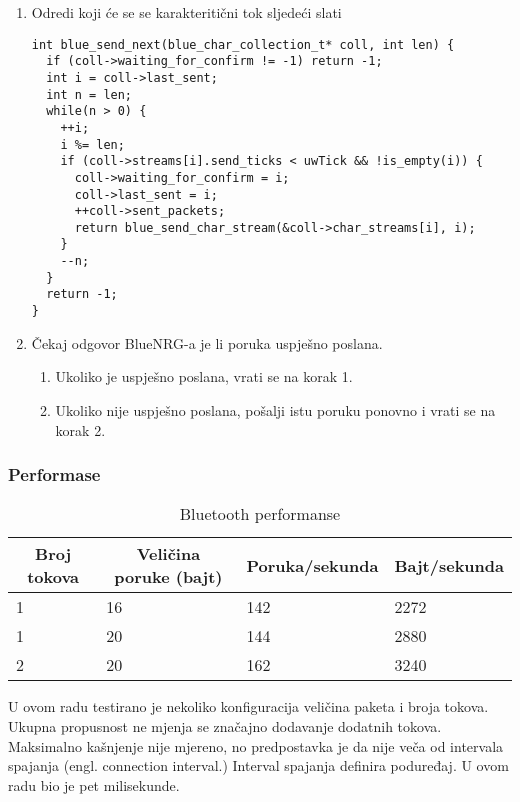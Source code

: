 \documentclass[times, utf8, diplomski]{diplomski}
\begin{document}
\begin{enumerate}
  \item Odredi koji će se se karakteritični tok sljedeći slati
\begin{lstlisting}[caption = {Procedura za odabir karakterističnog toka koji će sljedeći biti poslan}]
int blue_send_next(blue_char_collection_t* coll, int len) {
  if (coll->waiting_for_confirm != -1) return -1;
  int i = coll->last_sent;
  int n = len;
  while(n > 0) {
    ++i;
    i %= len;
    if (coll->streams[i].send_ticks < uwTick && !is_empty(i)) {
      coll->waiting_for_confirm = i;
      coll->last_sent = i;
      ++coll->sent_packets;
      return blue_send_char_stream(&coll->char_streams[i], i);
    }
    --n;
  }
  return -1;
}
\end{lstlisting}
  \item Čekaj odgovor BlueNRG-a je li poruka uspješno poslana.
    \begin{enumerate}
      \item Ukoliko je uspješno poslana, vrati se na korak 1.
      \item Ukoliko nije uspješno poslana, pošalji istu poruku ponovno i vrati se na korak 2.
    \end{enumerate}
\end{enumerate}


\subsubsection{Performase}

\begin{table}[h]
  \begin{center}
    \begin{tabular}[c]{l|l|l|l}
      \hline
      \multicolumn{1}{c|}{\textbf{Broj tokova}} &
      \multicolumn{1}{c}{\textbf{Veličina poruke (bajt)}} &
      \multicolumn{1}{c}{\textbf{Poruka/sekunda}} &
      \multicolumn{1}{c}{\textbf{Bajt/sekunda}} \\
      \hline
      1 & 16 & 142 & 2272 \\
      1 & 20 & 144 & 2880 \\
      2 & 20 & 162 & 3240 \\
      \hline
    \end{tabular}
  \caption{Bluetooth performanse}
  \end{center}
\end{table}

U ovom radu testirano je nekoliko konfiguracija veličina paketa i broja tokova. Ukupna propusnost ne mjenja se značajno dodavanje dodatnih tokova. Maksimalno kašnjenje nije mjereno, no predpostavka je da nije veča od intervala spajanja (engl. connection interval.) Interval spajanja definira poduređaj. U ovom radu bio je pet milisekunde.
\end{document}
